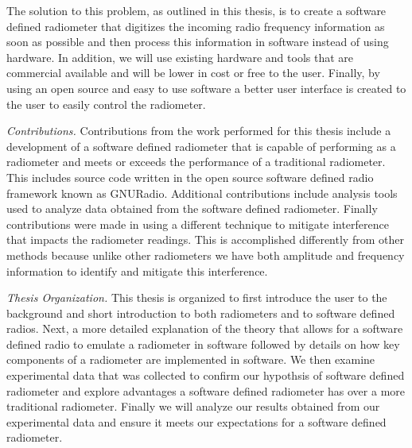 The solution to this problem, as outlined in this thesis, is to create a software defined radiometer that digitizes the incoming radio frequency information as soon as possible and then process this information in software instead of using hardware.  In addition, we will use existing hardware and tools that are commercial available and will be lower in cost or free to the user.  Finally, by using an open source and easy to use software a better user interface is created to the user to easily control the radiometer. 

\emph{Contributions.}  Contributions from the work performed for this thesis include a development of a software defined radiometer that is capable of performing as a radiometer and meets or exceeds the performance of a traditional radiometer.  This includes source code written in the open source software defined radio framework known as GNURadio.  Additional contributions include analysis tools used to analyze data obtained from the software defined radiometer.  Finally contributions were made in using a different technique to mitigate interference that impacts the radiometer readings.  This is accomplished differently from other methods because unlike other radiometers we have both amplitude and frequency information to identify and mitigate this interference.

\emph{Thesis Organization.}  This thesis is organized to first introduce the user to the background and short introduction to both radiometers and to software defined radios.  Next, a more detailed explanation of the theory that allows for a software defined radio to emulate a radiometer in software followed by details on how key components of a radiometer are implemented in software.  We then examine experimental data that was collected to confirm our hypothsis of software defined radiometer and explore advantages a software defined radiometer has over a more traditional radiometer.  Finally we will analyze our results obtained from our experimental data and ensure it meets our expectations for a software defined radiometer.

